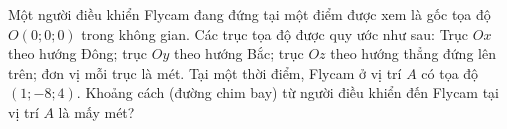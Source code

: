 \begin{bt}%
	Một người điều khiển Flycam đang đứng tại một điểm được xem là gốc tọa độ $O(0; 0; 0)$ trong không gian. Các trục tọa độ được quy ước như sau: Trục $Ox$ theo hướng Đông; trục $Oy$ theo hướng Bắc; trục $Oz$ theo hướng thẳng đứng lên trên; đơn vị mỗi trục là mét. Tại một thời điểm, Flycam ở vị trí $A$ có tọa độ $(1;-8;4)$. Khoảng cách (đường chim bay) từ người  điều khiển đến Flycam tại vị trí $A$ là mấy mét?
\end{bt}

